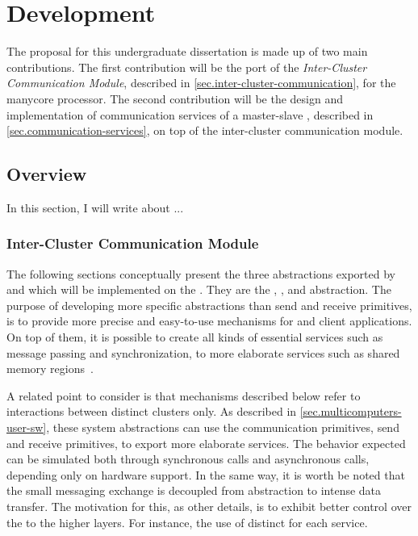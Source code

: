 \chapter{Development}
\label{ch.development}


	The proposal for this undergraduate dissertation is made up of two main contributions.
	The first contribution will be the port of the \textit{Inter-Cluster Communication Module},
	described in \autoref{sec.inter-cluster-communication}, for the \mppa manycore processor.
	The second contribution will be the design and implementation of communication services
	of a master-slave \os, described in \autoref{sec.communication-services}, on top of
	the inter-cluster communication module.

	\section{Overview}

		In this section, I will write about ...


		\subsection{Inter-Cluster Communication Module}
		\label{sec.inter-cluster-communication-module}

			The following sections conceptually present the three abstractions
			exported by \hal and which will be implemented on the \mppa.
			They are the \sync, \mailbox, and \portal abstraction.
			The purpose of developing more specific abstractions than
			send and receive primitives, is to provide more precise and easy-to-use
			mechanisms for \os and client applications.
			On top of them, it is possible to create all kinds of essential
			services such as message passing and synchronization,
			to more elaborate services such as shared memory regions~\cite{penna:rmen}.

			A related point to consider is that mechanisms described below refer
			to interactions between distinct clusters only.
			As described in \autoref{sec.multicomputers-user-sw}, these system
			abstractions can use the communication primitives, \ie send and receive
			primitives, to export more elaborate services.
			The behavior expected can be simulated both through synchronous calls
			and asynchronous calls, depending only on hardware support.
			In the same way, it is worth be noted that the small messaging exchange
			is decoupled from abstraction to intense data transfer.
			The motivation for this, as other details, is to exhibit better control
			over the \qos to the higher layers.
			For instance, the use of distinct \nocs for each service.

